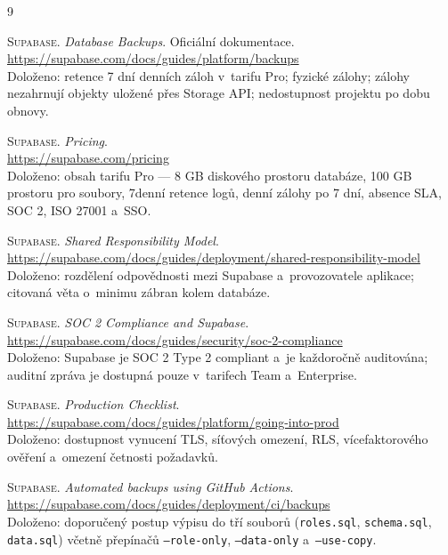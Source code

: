 \documentclass[11pt,a4paper]{article}
\begin{document}
\begin{thebibliography}{9}
\small

\textsc{Supabase.} \emph{Database Backups}. Oficiální dokumentace.\\
\url{https://supabase.com/docs/guides/platform/backups}\\
{\color{muted}Doloženo: retence 7 dní denních záloh v~tarifu Pro; fyzické zálohy; zálohy
nezahrnují objekty uložené přes Storage API; nedostupnost projektu po dobu obnovy.}

\textsc{Supabase.} \emph{Pricing}.\\
\url{https://supabase.com/pricing}\\
{\color{muted}Doloženo: obsah tarifu Pro --- 8 GB diskového prostoru databáze, 100 GB prostoru
pro soubory, 7denní retence logů, denní zálohy po 7 dní, absence SLA, SOC 2, ISO 27001 a~SSO.}

\textsc{Supabase.} \emph{Shared Responsibility Model}.\\
\url{https://supabase.com/docs/guides/deployment/shared-responsibility-model}\\
{\color{muted}Doloženo: rozdělení odpovědnosti mezi Supabase a~provozovatele aplikace; citovaná
věta o~minimu zábran kolem databáze.}

\textsc{Supabase.} \emph{SOC 2 Compliance and Supabase}.\\
\url{https://supabase.com/docs/guides/security/soc-2-compliance}\\
{\color{muted}Doloženo: Supabase je SOC 2 Type 2 compliant a~je každoročně auditována; auditní
zpráva je dostupná pouze v~tarifech Team a~Enterprise.}

\textsc{Supabase.} \emph{Production Checklist}.\\
\url{https://supabase.com/docs/guides/platform/going-into-prod}\\
{\color{muted}Doloženo: dostupnost vynucení TLS, síťových omezení, RLS, vícefaktorového ověření
a~omezení četnosti požadavků.}

\textsc{Supabase.} \emph{Automated backups using GitHub Actions}.\\
\url{https://supabase.com/docs/guides/deployment/ci/backups}\\
{\color{muted}Doloženo: doporučený postup výpisu do tří souborů (\texttt{roles.sql},
\texttt{schema.sql}, \texttt{data.sql}) včetně přepínačů \texttt{--role-only},
\texttt{--data-only} a~\texttt{--use-copy}.}


\end{thebibliography}
\end{document}
